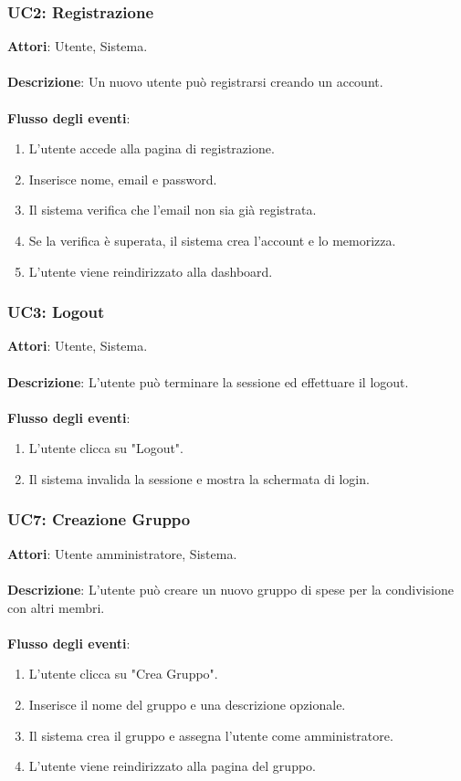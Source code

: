 \subsubsection{UC2: Registrazione}
\textbf{Attori}: Utente, Sistema.
\\
\\
\textbf{Descrizione}: Un nuovo utente può registrarsi creando un account.
\\
\\
\textbf{Flusso degli eventi}:
\begin{enumerate}
    \item L'utente accede alla pagina di registrazione.
    \item Inserisce nome, email e password.
    \item Il sistema verifica che l’email non sia già registrata.
    \item Se la verifica è superata, il sistema crea l’account e lo memorizza.
    \item L'utente viene reindirizzato alla dashboard.
\end{enumerate}

\subsubsection{UC3: Logout}
\textbf{Attori}: Utente, Sistema.
\\
\\
\textbf{Descrizione}: L'utente può terminare la sessione ed effettuare il logout.
\\
\\
\textbf{Flusso degli eventi}:
\begin{enumerate}
    \item L'utente clicca su "Logout".
    \item Il sistema invalida la sessione e mostra la schermata di login.
\end{enumerate}

\subsubsection{UC7: Creazione Gruppo}
\textbf{Attori}: Utente amministratore, Sistema.
\\
\\
\textbf{Descrizione}: L’utente può creare un nuovo gruppo di spese per la condivisione con altri membri.
\\
\\
\textbf{Flusso degli eventi}:
\begin{enumerate}
    \item L’utente clicca su "Crea Gruppo".
    \item Inserisce il nome del gruppo e una descrizione opzionale.
    \item Il sistema crea il gruppo e assegna l’utente come amministratore.
    \item L'utente viene reindirizzato alla pagina del gruppo.
\end{enumerate}

